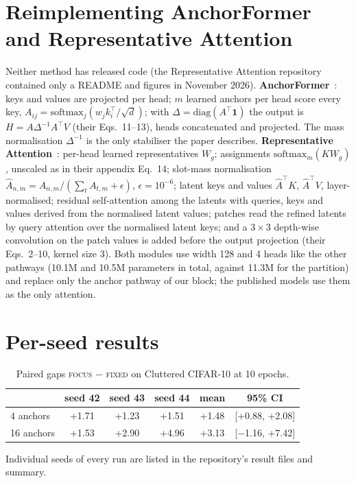 \documentclass[10pt]{article}
\newcommand{\focus}{\textsc{focus}}
\newcommand{\fixed}{\textsc{fixed}}
\begin{document}
\section{Reimplementing AnchorFormer and Representative Attention}
\label{app:reimpl}
Neither method has released code (the Representative Attention repository contained only a README
and figures in November 2026). \textbf{AnchorFormer}~\citep{anchorformer2025}: keys and values are
projected per head; $m$ learned anchors per head score every key, $A_{ij}=\mathrm{softmax}_j(w_j
k_i^{\top}/\sqrt{d})$; with $\Delta=\mathrm{diag}(A^{\top}\mathbf{1})$ the output is
$H=A\Delta^{-1}A^{\top}V$ (their Eqs.~11--13), heads concatenated and projected. The mass
normalisation $\Delta^{-1}$ is the only stabiliser the paper describes. \textbf{Representative
Attention}~\citep{representative2026}: per-head learned representatives $W_g$; assignments
$\mathrm{softmax}_m(KW_g)$, unscaled as in their appendix Eq.~14; slot-mass normalisation
$\hat A_{n,m}=A_{n,m}/(\sum_t A_{t,m}+\epsilon)$, $\epsilon=10^{-6}$; latent keys and values
$\hat A^{\top}K$, $\hat A^{\top}V$, layer-normalised; residual self-attention among the latents
with queries, keys and values derived from the normalised latent values; patches read the refined
latents by query attention over the normalised latent keys; and a $3\times3$ depth-wise
convolution on the patch values is added before the output projection (their Eqs.~2--10, kernel
size 3). Both modules use width 128 and 4 heads like the other pathways (10.1M and 10.5M
parameters in total, against 11.3M for the partition) and replace only the anchor pathway of our
block; the published models use them as the only attention.

\section{Per-seed results}
\label{app:perseed}
\begin{table}[h]
\centering
\caption{Paired gaps \focus{} $-$ \fixed{} on Cluttered CIFAR-10 at 10 epochs.}
\begin{tabular}{lccccc}
\toprule
& seed 42 & seed 43 & seed 44 & mean & 95\% CI \\
\midrule
4 anchors & +1.71 & +1.23 & +1.51 & +1.48 & [+0.88, +2.08] \\
16 anchors & +1.53 & +2.90 & +4.96 & +3.13 & [$-$1.16, +7.42] \\
\bottomrule
\end{tabular}
\end{table}
Individual seeds of every run are listed in the repository's result files and summary.
\end{document}
